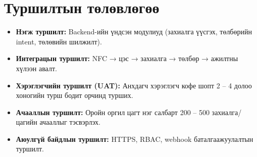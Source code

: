 \section{Туршилтын төлөвлөгөө}

\begin{itemize}
  \item \textbf{Нэгж туршилт:} Backend-ийн үндсэн модулиуд (захиалга
        үүсгэх, төлбөрийн intent, төлөвийн шилжилт).
  \item \textbf{Интеграцын туршилт:} NFC → цэс → захиалга → төлбөр →
        ажилтны хүлээн авалт.
  \item \textbf{Хэрэглэгчийн туршилт (UAT):} Анхдагч хэрэглэгч кофе шопт 2 -- 4
        долоо хоногийн турш бодит орчинд турших.
  \item \textbf{Ачааллын туршилт:} Оройн оргил цагт нэг салбарт
        200 -- 500 захиалга/цагийн ачааллыг тэсвэрлэх.
  \item \textbf{Аюулгүй байдлын туршилт:} HTTPS, RBAC, webhook
        баталгаажуулалтын туршилт.
\end{itemize}
